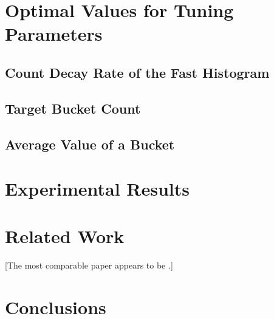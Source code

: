 \documentclass{sig-alternate}
\begin{document}
\section{Optimal Values for Tuning Parameters}
\label{sec:optimalTuningParameters}
\subsection{Count Decay Rate of the Fast Histogram}
\subsection{Target Bucket Count}
\subsection{Average Value of a Bucket}

\section{Experimental Results}

\section{Related Work}
    [The most comparable paper appears to be \cite{kifer2004detecting}.]

\section{Conclusions}



\end{document}
